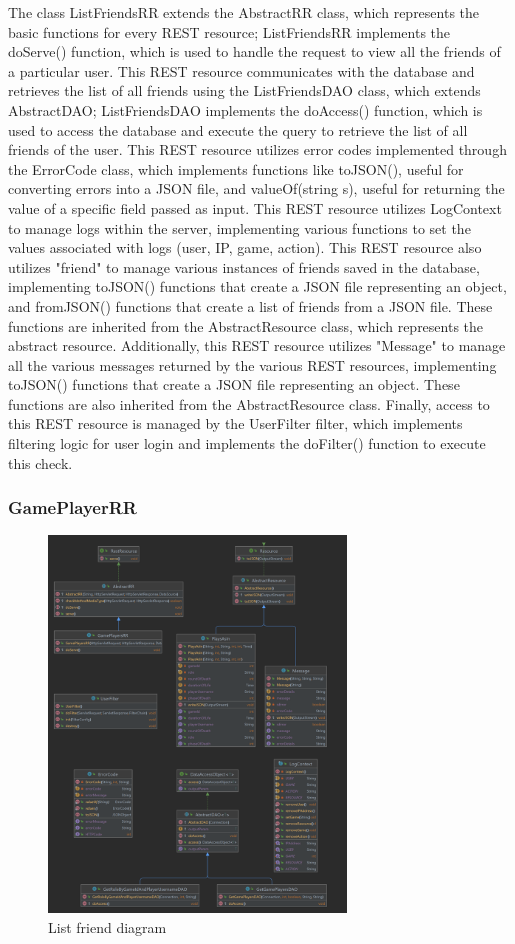The class ListFriendsRR extends the AbstractRR class, which represents the basic functions for every REST resource; ListFriendsRR implements the doServe() function, which is used to handle the request to view all the friends of a particular user.
This REST resource communicates with the database and retrieves the list of all friends using the ListFriendsDAO class, which extends AbstractDAO; ListFriendsDAO implements the doAccess() function, which is used to access the database and execute the query to retrieve the list of all friends of the user.
This REST resource utilizes error codes implemented through the ErrorCode class, which implements functions like toJSON(), useful for converting errors into a JSON file, and valueOf(string s), useful for returning the value of a specific field passed as input.
This REST resource utilizes LogContext to manage logs within the server, implementing various functions to set the values associated with logs (user, IP, game, action).
This REST resource also utilizes "friend" to manage various instances of friends saved in the database, implementing toJSON() functions that create a JSON file representing an object, and fromJSON() functions that create a list of friends from a JSON file. These functions are inherited from the AbstractResource class, which represents the abstract resource.
Additionally, this REST resource utilizes "Message" to manage all the various messages returned by the various REST resources, implementing toJSON() functions that create a JSON file representing an object. These functions are also inherited from the AbstractResource class.
Finally, access to this REST resource is managed by the UserFilter filter, which implements filtering logic for user login and implements the doFilter() function to execute this check.


\subsubsection{GamePlayerRR}
\begin{figure}[htb] 
    \centering
    \includegraphics[height=10cm]{images/class_diagram/game_Player_diagram.png}
    \caption{List friend diagram}
    \label{fig:list_friend_diagram}
\end{figure}

